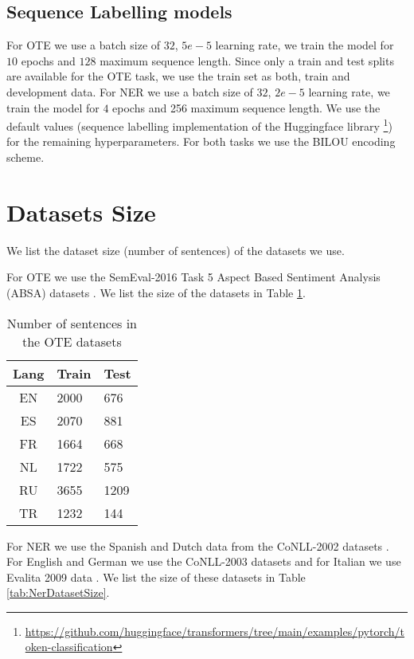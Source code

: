 \documentclass[11pt]{article}
\begin{document}
\subsection{Sequence Labelling models}\label{sec:appendix-models}
For OTE we use a batch size of $32$, $5e-5$ learning rate, we train the model for $10$ epochs and $128$ maximum sequence length. Since only a train and test splits are available for the OTE task, we use the train set as both, train and development data. 
For NER we use a batch size of $32$, $2e-5$ learning rate, we train the model for $4$ epochs and 256 maximum sequence length. We use the default values (sequence labelling implementation of the Huggingface library \footnote{\url{https://github.com/huggingface/transformers/tree/main/examples/pytorch/token-classification}}) for the remaining hyperparameters. 
For both tasks we use the BILOU encoding scheme. 

\section{Datasets Size}\label{sec:appendix-datasets}

We list the dataset size (number of sentences) of the datasets we use. 

For OTE we use the SemEval-2016 Task 5 Aspect Based Sentiment Analysis (ABSA) datasets \cite{pontiki-etal-2016-semeval}. We list the size of the datasets in Table \ref{tab:OteDatasetSize}.

\begin{table}[htbp]
    \centering
\begin{tabular}{c|ll}
Lang & Train & Test \\
\hline
EN & 2000 & 676 \\
ES & 2070 & 881 \\
FR & 1664 & 668 \\
NL & 1722 & 575 \\
RU & 3655 & 1209 \\
TR & 1232 & 144 \\
\end{tabular}
    \caption{Number of sentences in the OTE datasets}
    \label{tab:OteDatasetSize}
\end{table}

For NER we use the Spanish and Dutch data from the CoNLL-2002 datasets \cite{tjong-kim-sang-2002-introduction}. For English and German we use the CoNLL-2003 datasets \cite{tjong-kim-sang-de-meulder-2003-introduction} and for Italian we use Evalita 2009 data \cite{speranza2009named}. We list the size of these datasets in Table \ref{tab:NerDatasetSize}.
\end{document}
